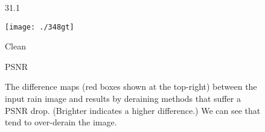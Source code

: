 \documentclass[10pt,twocolumn,letterpaper]{article}
\begin{document}
\begin{figure}[ht]
\begin{minipage}[t]{0.15\linewidth}
		\centerline{\tiny 31.1}
		\end{minipage}
		\begin{minipage}[t]{0.15\linewidth}
		\texttt{[image: ./348gt]}\vspace{-0.08in}
		\vspace{-0.08in}\centerline{\tiny Clean}
		\centerline{\tiny PSNR}
		\end{minipage}
		\vspace{0.03in}
		\caption{The difference maps (red boxes shown at the top-right) between the input rain image and results by deraining methods that suffer a PSNR drop. (Brighter indicates a higher difference.) We can see that \cite{luo:iccv:2015:dsc,yang:cvpr:2017:j,zhang:cvpr:2018:did,li:eccv:2018:rsecan} tend to over-derain the image.}
		\label{fig:example3}

\end{figure}
\end{document}
